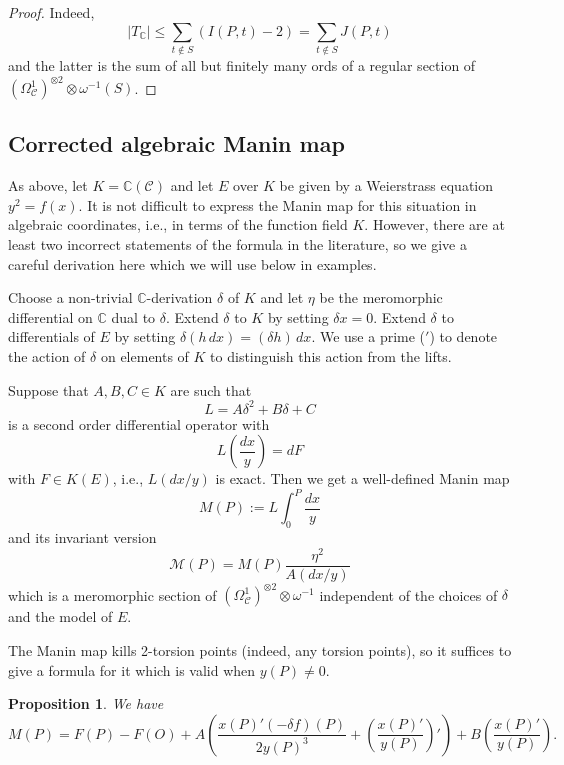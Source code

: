 \documentclass[12pt,reqno]{amsart}
\numberwithin{equation}{section}
\theoremstyle{plain}
\newtheorem{prop}[subsection]{Proposition}
\theoremstyle{definition}
\theoremstyle{remark}
\newcommand{\CC}{\mathcal{C}}
\newcommand{\MM}{\mathcal{M}}
\newcommand{\C}{\mathbb{C}}
\newcommand{\<}{\langle}
\renewcommand{\>}{\rangle}
\newcommand{\tensor}{\otimes}
\numberwithin{equation}{section}
\begin{document}
\begin{proof}
  Indeed,
  \[|T_\C|\le\sum_{t\not\in S} \left(I(P,t)-2\right)=\sum_{t\not\in
      S}J(P,t)\]
  and the latter is the sum of all but finitely many ords of a
  regular section of
  $\left(\Omega^1_\CC\right)^{\tensor2}\tensor\omega^{-1}(S)$. 
\end{proof}


\subsection{Corrected algebraic Manin map}
As above, let $K=\C(\CC)$ and let $E$ over $K$ be given by a
Weierstrass equation $y^2=f(x)$.  It is not difficult to express the
Manin map for this situation in algebraic coordinates, i.e., in terms
of the function field $K$.  However, there are at least two
incorrect statements of the formula in the literature, so we give a
careful derivation here which we will use below in examples.  

Choose a non-trivial $\C$-derivation $\delta$ of $K$ and let $\eta$ be
the meromorphic differential on $\C$ dual to $\delta$.  Extend
$\delta$ to $K$ by setting $\delta x=0$. Extend $\delta$ to
differentials of $E$ by setting $\delta(h\,dx)=(\delta h)\,dx$.  We use
a prime ($'$) to denote the action of $\delta$ on elements of $K$ to
distinguish this action from the lifts.

Suppose that $A,B,C\in K$ are such that
\[L=A\delta^2+B\delta+C\]
is a second order differential operator with
\[L\left(\frac{dx}y\right)=dF\]
with $F\in K(E)$, i.e., $L(dx/y)$ is exact.  Then we get a
well-defined Manin map
\[M(P):=L\int_0^P\frac{dx}y\]
and its invariant version
\[\MM(P)=M(P)\frac{\eta^2}{A(dx/y)}\]
which is a meromorphic section of
$\left(\Omega^1_\CC\right)^{\tensor2}\tensor\omega^{-1}$ 
independent of the choices of $\delta$ and the model of $E$.

The Manin map kills 2-torsion points (indeed, any torsion points), so
it suffices to give a formula for it which is valid when $y(P)\neq0$.

\begin{prop}\label{prop:Manin-coords}
  We have
  \[M(P)=F(P)-F(O)+
    A\left(\frac{x(P)'(-\delta f)(P)}{2y(P)^3}
      +\left(\frac{x(P)'}{y(P)}\right)'\right)
    +B\left(\frac{x(P)'}{y(P)}\right).\]
\end{prop}
\end{document}
